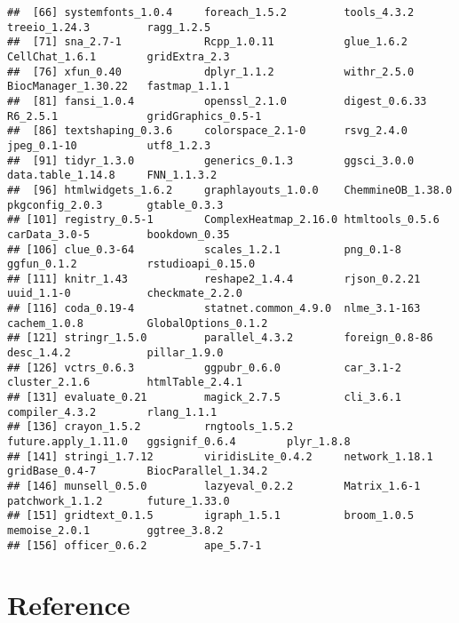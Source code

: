 \documentclass[
]{article}
\begin{document}
\begin{verbatim}
##  [66] systemfonts_1.0.4     foreach_1.5.2         tools_4.3.2           treeio_1.24.3         ragg_1.2.5           
##  [71] sna_2.7-1             Rcpp_1.0.11           glue_1.6.2            CellChat_1.6.1        gridExtra_2.3        
##  [76] xfun_0.40             dplyr_1.1.2           withr_2.5.0           BiocManager_1.30.22   fastmap_1.1.1        
##  [81] fansi_1.0.4           openssl_2.1.0         digest_0.6.33         R6_2.5.1              gridGraphics_0.5-1   
##  [86] textshaping_0.3.6     colorspace_2.1-0      rsvg_2.4.0            jpeg_0.1-10           utf8_1.2.3           
##  [91] tidyr_1.3.0           generics_0.1.3        ggsci_3.0.0           data.table_1.14.8     FNN_1.1.3.2          
##  [96] htmlwidgets_1.6.2     graphlayouts_1.0.0    ChemmineOB_1.38.0     pkgconfig_2.0.3       gtable_0.3.3         
## [101] registry_0.5-1        ComplexHeatmap_2.16.0 htmltools_0.5.6       carData_3.0-5         bookdown_0.35        
## [106] clue_0.3-64           scales_1.2.1          png_0.1-8             ggfun_0.1.2           rstudioapi_0.15.0    
## [111] knitr_1.43            reshape2_1.4.4        rjson_0.2.21          uuid_1.1-0            checkmate_2.2.0      
## [116] coda_0.19-4           statnet.common_4.9.0  nlme_3.1-163          cachem_1.0.8          GlobalOptions_0.1.2  
## [121] stringr_1.5.0         parallel_4.3.2        foreign_0.8-86        desc_1.4.2            pillar_1.9.0         
## [126] vctrs_0.6.3           ggpubr_0.6.0          car_3.1-2             cluster_2.1.6         htmlTable_2.4.1      
## [131] evaluate_0.21         magick_2.7.5          cli_3.6.1             compiler_4.3.2        rlang_1.1.1          
## [136] crayon_1.5.2          rngtools_1.5.2        future.apply_1.11.0   ggsignif_0.6.4        plyr_1.8.8           
## [141] stringi_1.7.12        viridisLite_0.4.2     network_1.18.1        gridBase_0.4-7        BiocParallel_1.34.2  
## [146] munsell_0.5.0         lazyeval_0.2.2        Matrix_1.6-1          patchwork_1.1.2       future_1.33.0        
## [151] gridtext_0.1.5        igraph_1.5.1          broom_1.0.5           memoise_2.0.1         ggtree_3.8.2         
## [156] officer_0.6.2         ape_5.7-1
\end{verbatim}

\hypertarget{bibliography}{%
\section*{Reference}\label{bibliography}}
\end{document}
